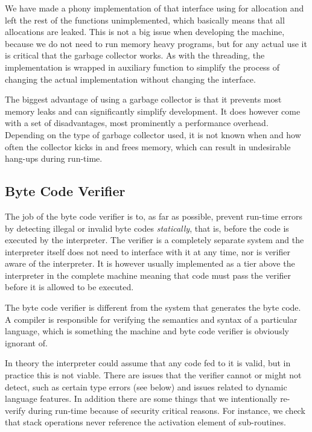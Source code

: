 We have made a phony implementation of that interface using  for
allocation and left the rest of the functions unimplemented, which basically
means that all allocations are leaked. This is not a big issue when developing
the machine, because we do not need to run memory heavy programs, but for any
actual use it is critical that the garbage collector works. As with the
threading, the implementation is wrapped in auxiliary function to simplify the
process of changing the actual implementation without changing the interface.

The biggest advantage of using a garbage collector is that it prevents most
memory leaks and can significantly simplify development. It does however come
with a set of disadvantages, most prominently a performance overhead. Depending
on the type of garbage collector used, it is not known when and how often the
collector kicks in and frees memory, which can result in undesirable hang-ups
during run-time.

\subsection{Byte Code Verifier}

The job of the byte code verifier is to, as far as possible, prevent run-time
errors by detecting illegal or invalid byte codes \emph{statically}, that is,
before the code is executed by the interpreter. The verifier is a completely
separate system and the interpreter itself does not need to interface with it at
any time, nor is verifier aware of the interpreter. It is however usually
implemented as a tier above the interpreter in the complete machine meaning that
code must pass the verifier before it is allowed to be executed.

The byte code verifier is different from the system that generates the byte
code. A compiler is responsible for verifying the semantics and syntax of a
particular language, which is something the machine and byte code verifier is
obviously ignorant of.

In theory the interpreter could assume that any code fed to it is valid, but in
practice this is not viable. There are issues that the verifier cannot or might
not detect, such as certain type errors (see below) and issues related to
dynamic language features. In addition there are some things that we
intentionally re-verify during run-time because of security critical
reasons. For instance, we check that stack operations never reference the
activation element of sub-routines.

